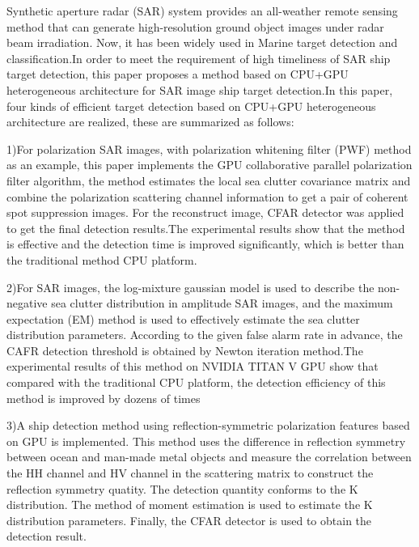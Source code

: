 \begin{eabstract}
  Synthetic aperture radar (SAR) system provides an all-weather remote sensing method 
  that can generate high-resolution ground object images under radar beam irradiation. 
  Now, it has been widely used in Marine target detection and classification.In order 
  to meet the requirement of high timeliness of SAR ship target detection, this paper
  proposes a method based on CPU+GPU heterogeneous architecture for SAR image ship target 
  detection.In this paper, four kinds of efficient target detection based on CPU+GPU heterogeneous
  architecture are realized, these are summarized as follows:

  1)For polarization SAR images, with polarization whitening filter (PWF) method as an example,
  this paper implements the GPU collaborative parallel polarization filter algorithm, the method 
  estimates the local sea clutter covariance matrix and combine the polarization scattering channel information to 
  get a pair of coherent spot suppression images. For the reconstruct image, CFAR detector was applied to get the 
  final detection results.The experimental results show that the method is effective and the detection 
  time is improved significantly, which is better than the traditional method
  CPU platform.

  2)For SAR images, the log-mixture gaussian model is used to describe the non-negative 
  sea clutter distribution in amplitude SAR images, and the maximum expectation (EM) 
  method is used to effectively estimate the sea clutter distribution parameters. 
  According to the given false alarm rate in advance, the CAFR detection threshold is 
  obtained by Newton iteration method.The experimental results of this method on NVIDIA
  TITAN V GPU show that compared with the traditional CPU platform, the detection
  efficiency of this method is improved by dozens of times

  3)A ship detection method using reflection-symmetric polarization features based on GPU 
  is implemented. This method uses the difference in reflection symmetry between ocean and 
  man-made metal objects and measure the correlation between the HH channel and HV channel in the scattering matrix 
  to construct the reflection symmetry quatity.  The detection quantity conforms to the K distribution. 
  The method of moment estimation is used to estimate the K distribution parameters.
   Finally, the CFAR detector is used to obtain the detection result.


\end{eabstract}
